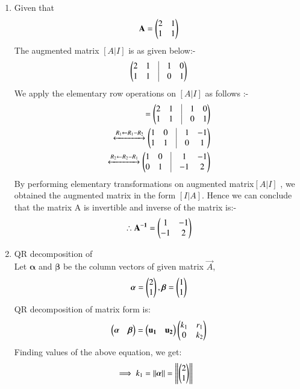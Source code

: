 \begin{enumerate}
\item Given that
\begin{align}
\mathbf{A} = \begin{pmatrix}2 & 1 \\ 1 & 1\end{pmatrix}
\end{align}
The augmented matrix $ [A | I]$ is as given below:- 
\begin{align}
\myvec{2 & 1 & \vrule & 1 & 0 \\ 1 & 1 & \vrule & 0 & 1}
\end{align}
We apply the elementary row operations on $ [A | I]$ as follows :-
\begin{align}
[A | I] = \myvec{2 & 1 & \vrule & 1 & 0 \\ 1 & 1 & \vrule & 0 & 1}
\\
\xleftrightarrow{R_1\leftarrow R_1-R_2}   
\myvec{1 & 0 & \vrule & 1 & -1 \\ 1 & 1 & \vrule & 0 & 1}
\\
\xleftrightarrow{R_2\leftarrow R_2-R_1}
\myvec{1 & 0 & \vrule & 1 & -1 \\ 0 & 1 & \vrule & -1 & 2}
\end{align}
By performing elementary transformations on augmented matrix$ [A | I]$ , we obtained the augmented matrix in the form $ [I | A]$. 
Hence we can conclude that the matrix A is invertible and inverse of the matrix is:-
\begin{align}
\therefore\mathbf{A^{-1}}=\begin{pmatrix}1 & -1 \\  -1 & 2\end{pmatrix} 
\end{align}
\item QR decomposition of  
\\
Let $\boldsymbol{\alpha}$ and $\boldsymbol{\beta}$ be the column vectors of given matrix $\vec{A}$,
\begin{align}
\boldsymbol{\alpha}=\begin{pmatrix}2 \\ 1\end{pmatrix},
\boldsymbol{\beta}=\begin{pmatrix}1 \\ 1\end{pmatrix} \label{matrix/2/26/1.0}
\end{align}
QR decomposition of matrix form is:
\begin{align}
\begin{pmatrix}\boldsymbol{\alpha} & \boldsymbol{\beta}\end{pmatrix}=\begin{pmatrix}\mathbf{u_1} & \mathbf{u_2}\end{pmatrix}\begin{pmatrix}k_1 & r_1 \\ 0 & k_2\end{pmatrix} \label{matrix/2/26/1.1}
\end{align}
Finding values of the above equation, we get:
\begin{align}
\implies k_1&=\norm{\boldsymbol{\alpha}}=\norm{\myvec{2 \\ 1}}

\end{align}
\end{enumerate}
